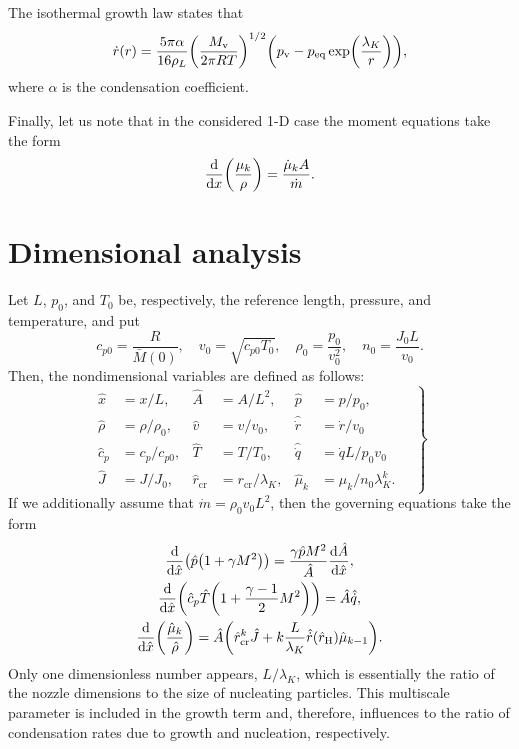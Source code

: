 \documentclass{article}
\newcommand{\vap}{\text{v}}
\newcommand{\eq}{\text{eq}}
\newcommand{\crit}[2][]{#2_\text{cr#1}}
\newcommand{\Hill}{\text{H}}
\begin{document}
The isothermal growth law states that
\begin{equation}\label{eq:dotr}
    \dot{r}(r) = \frac{5\pi\alpha}{16\rho_L}
    \qty(\frac{M_\vap}{2\pi RT})^{1/2}
        \qty(p_\vap-p_\eq\exp(\frac{\lambda_K}{r})),
\end{equation}
where $\alpha$ is the condensation coefficient.

Finally, let us note that in the considered 1-D case the moment equations take the form
\begin{equation}\label{eq:moments}
    \dv{x}(\frac{\mu_k}{\rho}) = \frac{\dot{\mu}_kA}{\dot{m}}.
\end{equation}

\section{Dimensional analysis}

Let $L$, $p_0$, and $T_0$ be, respectively, the reference length, pressure, and temperature, and put
\begin{equation}\label{eq:reference}
    c_{p0} = \frac{R}{\bar{M}(0)}, \quad v_0 = \sqrt{c_{p0}T_0}, \quad
    \rho_0 = \frac{p_0}{v_0^2}, \quad n_0 = \frac{J_0L}{v_0}.
\end{equation}
Then, the nondimensional variables are defined as follows:
\begin{equation}\label{eq:nondimensional}
    \left.\begin{aligned}
        \hat{x} &= x/L,             &\hat{A} &= A/L^2,              &\hat{p} &= p/p_0, \\
        \hat{\rho} &= \rho/\rho_0,  &\hat{v} &= v/v_0,              &\hat{\dot{r}} &= \dot{r}/v_0 \\
        \hat{c}_p &= c_p/c_{p0},    &\hat{T} &= T/T_0,              &\hat{\dot{q}} &= \dot{q}L/p_0v_0 \\
        \hat{J} &= J/J_0,    &\crit{\hat{r}} &= \crit{r}/\lambda_K, &\hat{\mu}_k &= \mu_k/n_0\lambda_K^k.
    \end{aligned}\quad\right\}
\end{equation}
If we additionally assume that $\dot{m} = \rho_0v_0L^2$, then the governing equations take the form
\begin{gather}
    \dv{\hat{x}}(\hat{p}\qty(1 + \gamma M^2))
        = \frac{\gamma \hat{p} M^2}{\hat{A}}\dv{\hat{A}}{\hat{x}}, \label{eq:momentum3}\\
    \dv{\hat{x}}(\hat{c}_p\hat{T}\qty(1 + \frac{\gamma-1}{2}M^2))
        = \hat{A}\hat{\dot{q}}, \label{eq:energy3}\\
    \dv{\hat{x}}(\frac{\hat{\mu}_k}{\hat{\rho}}) = \hat{A}\qty(\crit{\hat{r}}^{k}\hat{J}
        + k\frac{L}{\lambda_K}\hat{\dot{r}}(\hat{r}_\Hill)\hat{\mu}_{k-1}). \label{eq:moments3}
\end{gather}
Only one dimensionless number appears, $L/\lambda_K$, which is essentially the ratio of the nozzle dimensions
to the size of nucleating particles. This multiscale parameter is included in the growth term
and, therefore, influences to the ratio of condensation rates due to growth and nucleation, respectively.
\end{document}

